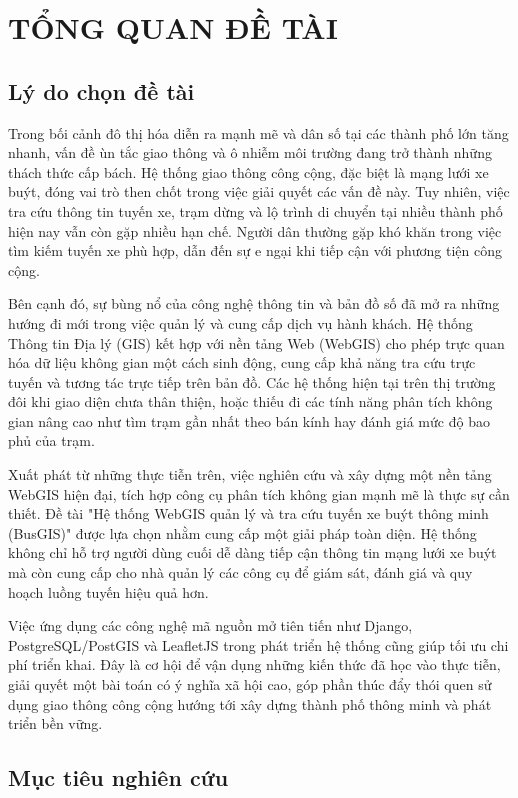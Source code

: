 \chapter{TỔNG QUAN ĐỀ TÀI}

\section{Lý do chọn đề tài}

Trong bối cảnh đô thị hóa diễn ra mạnh mẽ và dân số tại các thành phố lớn tăng nhanh, vấn đề ùn tắc giao thông và ô nhiễm môi trường đang trở thành những thách thức cấp bách. Hệ thống giao thông công cộng, đặc biệt là mạng lưới xe buýt, đóng vai trò then chốt trong việc giải quyết các vấn đề này. Tuy nhiên, việc tra cứu thông tin tuyến xe, trạm dừng và lộ trình di chuyển tại nhiều thành phố hiện nay vẫn còn gặp nhiều hạn chế. Người dân thường gặp khó khăn trong việc tìm kiếm tuyến xe phù hợp, dẫn đến sự e ngại khi tiếp cận với phương tiện công cộng.

Bên cạnh đó, sự bùng nổ của công nghệ thông tin và bản đồ số đã mở ra những hướng đi mới trong việc quản lý và cung cấp dịch vụ hành khách. Hệ thống Thông tin Địa lý (GIS) kết hợp với nền tảng Web (WebGIS) cho phép trực quan hóa dữ liệu không gian một cách sinh động, cung cấp khả năng tra cứu trực tuyến và tương tác trực tiếp trên bản đồ. Các hệ thống hiện tại trên thị trường đôi khi giao diện chưa thân thiện, hoặc thiếu đi các tính năng phân tích không gian nâng cao như tìm trạm gần nhất theo bán kính hay đánh giá mức độ bao phủ của trạm.

Xuất phát từ những thực tiễn trên, việc nghiên cứu và xây dựng một nền tảng WebGIS hiện đại, tích hợp công cụ phân tích không gian mạnh mẽ là thực sự cần thiết. Đề tài "Hệ thống WebGIS quản lý và tra cứu tuyến xe buýt thông minh (BusGIS)" được lựa chọn nhằm cung cấp một giải pháp toàn diện. Hệ thống không chỉ hỗ trợ người dùng cuối dễ dàng tiếp cận thông tin mạng lưới xe buýt mà còn cung cấp cho nhà quản lý các công cụ để giám sát, đánh giá và quy hoạch luồng tuyến hiệu quả hơn.

Việc ứng dụng các công nghệ mã nguồn mở tiên tiến như Django, PostgreSQL/PostGIS và LeafletJS trong phát triển hệ thống cũng giúp tối ưu chi phí triển khai. Đây là cơ hội để vận dụng những kiến thức đã học vào thực tiễn, giải quyết một bài toán có ý nghĩa xã hội cao, góp phần thúc đẩy thói quen sử dụng giao thông công cộng hướng tới xây dựng thành phố thông minh và phát triển bền vững.

\section{Mục tiêu nghiên cứu}

